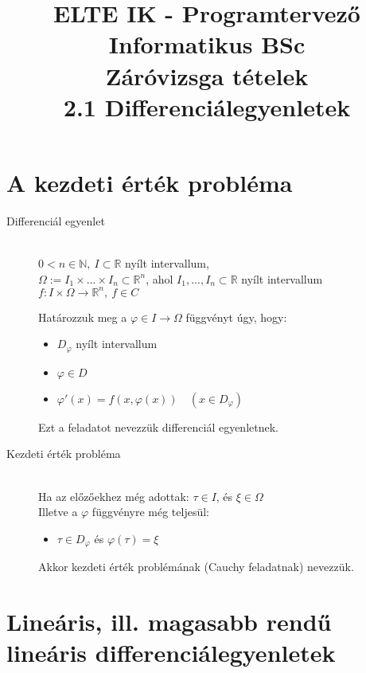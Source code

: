 \documentclass[margin=0px]{article}
\title{\textbf{{\Large ELTE IK - Programtervező Informatikus BSc} \vspace{0.2cm} \\ {\huge Záróvizsga tételek}} \vspace{0.3cm} \\ 2.1 Differenciálegyenletek}
\author{}
\date{}
\newcommand{\R}{\mathbb{R}}
\begin{document}
\maketitle

\section{A kezdeti érték probléma}
\begin{description}
    \item[Differenciál egyenlet] \hfill \\
        $ 0 < n \in \mathbb{N}, \ I \subset \R$ nyílt intervallum, \\
        $ \Omega := I_1 \times ... \times I_n \subset \R^n$, ahol $ I_1,...,I_n \subset \R$ nyílt intervallum \\
        $f:I\times\Omega \rightarrow \R^n, \ f \in C $

        Határozzuk meg a $ \varphi \in I \rightarrow \Omega$ függvényt úgy, hogy:
        \begin{itemize}
            \item $ D_{\varphi} $ nyílt intervallum
            \item $ \varphi \in D $
            \item $ \varphi'(x) = f(x, \varphi(x)) \quad (x \in D_{\varphi}) $
        \end{itemize}

        Ezt a feladatot nevezzük differenciál egyenletnek.
    \item[Kezdeti érték probléma] \hfill \\
        Ha az előzőekhez még adottak: $ \tau \in I$, és $ \xi \in \Omega$ \\
        Illetve a $\varphi$ függvényre még teljesül:
        \begin{itemize}
            \item $\tau \in D_{\varphi}$ és $ \varphi(\tau) = \xi $
        \end{itemize}

        Akkor kezdeti érték problémának (Cauchy feladatnak) nevezzük.
\end{description}
\section{Lineáris, ill. magasabb rendű lineáris differenciálegyenletek}
\end{document}
